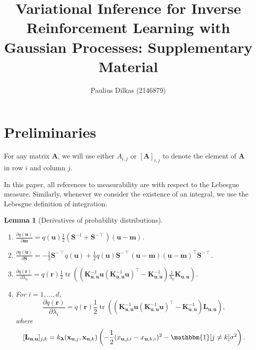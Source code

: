 \documentclass{article}
\title{Variational Inference for Inverse Reinforcement Learning with Gaussian
  Processes: Supplementary Material}
\author{Paulius Dilkas (2146879)}
\newtheorem{lemma}[theorem]{Lemma}
\theoremstyle{definition}
\DeclareMathOperator{\tr}{tr}
\newcommand{\Kuu}{\mathbf{K}_{\mathbf{u},\mathbf{u}}}
\newcommand{\Luu}{\mathbf{L}_{\mathbf{u},\mathbf{u}}}
\begin{document}
\maketitle

\section{Preliminaries}

For any matrix $\mathbf{A}$, we will use either $A_{i,j}$ or
$[\mathbf{A}]_{i,j}$ to denote the element of $\mathbf{A}$ in row $i$ and column
$j$.

In this paper, all references to measurability are with respect to the Lebesgue
measure. Similarly, whenever we consider the existence of an integral, we use
the Lebesgue definition of integration.

\begin{lemma}[Derivatives of probability
  distributions] \label{lemma:derivatives}
  \begin{enumerate}
    \leavevmode
  \item $\frac{\partial q(\mathbf{u})}{\partial \mathbf{m}} =
    q(\mathbf{u})\frac{1}{2}(\mathbf{S}^{-1} +
    \mathbf{S}^{-\intercal})(\mathbf{u} - \mathbf{m})$.
  \item $\frac{\partial q(\mathbf{u})}{\partial \mathbf{S}} =
    -\frac{1}{2}\mathbf{S}^{-\intercal}q(\mathbf{u}) +
    \frac{1}{2}q(\mathbf{u})\mathbf{S}^{-\intercal}(\mathbf{u} -
    \mathbf{m})(\mathbf{u} - \mathbf{m})^\intercal\mathbf{S}^{-\intercal}$.
  \item $\frac{\partial q(\mathbf{r})}{\partial \lambda_0} =
    q(\mathbf{r})\frac{1}{2}\tr
    \left((\Kuu^{-1}\mathbf{u}(\Kuu^{-1}\mathbf{u})^\intercal - \Kuu^{-1})
      \frac{1}{\lambda_0}\Kuu \right)$.
  \item For $i = 1, \dots, d$,
    \[
      \frac{\partial q(\mathbf{r})}{\partial \lambda_i} =
      q(\mathbf{r})\frac{1}{2}\tr
      \left((\Kuu^{-1}\mathbf{u}(\Kuu^{-1}\mathbf{u})^\intercal - \Kuu^{-1})
        \Luu \right),
    \]
    where
    \[
      [\Luu]_{j,k} = k_{\bm\lambda}(\mathbf{x}_{\mathbf{u},j},
      \mathbf{x}_{\mathbf{u},k}) \left( -\frac{1}{2}(x_{\mathbf{u},j,i} -
        x_{\mathbf{u},k,i})^2 - \mathbbm{1}[j \ne k]\sigma^2 \right).
    \]
  \end{enumerate}
\end{lemma}
\end{document}
